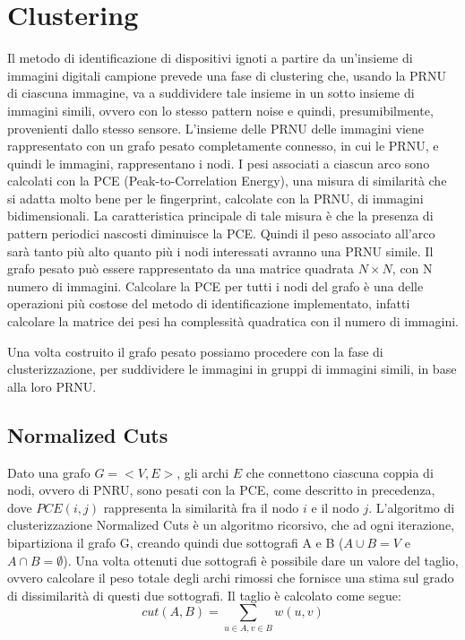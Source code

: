 \section{Clustering}

Il metodo di identificazione di dispositivi ignoti a partire da un'insieme di immagini digitali campione prevede una fase di clustering che, usando la PRNU di ciascuna immagine, va a suddividere tale insieme in un sotto insieme di immagini simili, ovvero con lo stesso pattern noise e quindi, presumibilmente, provenienti dallo stesso sensore.
L'insieme delle PRNU delle immagini viene rappresentato con un grafo pesato completamente connesso, in cui le PRNU, e quindi le immagini, rappresentano i nodi. I pesi associati a ciascun arco sono calcolati con la PCE (Peak-to-Correlation Energy), una misura di similarità che si adatta molto bene per le fingerprint, calcolate con la PRNU, di immagini bidimensionali. La caratteristica principale di tale misura è che la presenza di pattern periodici nascosti diminuisce la PCE. Quindi il peso associato all'arco sarà tanto più alto quanto più i nodi interessati avranno una PRNU simile. Il grafo pesato può essere rappresentato da una matrice quadrata $N\times N$, con N numero di immagini.
Calcolare la PCE per tutti i nodi del grafo è una delle operazioni più costose del metodo di identificazione implementato, infatti calcolare la matrice dei pesi ha complessità quadratica con il numero di immagini.

Una volta costruito il grafo pesato possiamo procedere con la fase di clusterizzazione, per suddividere le immagini in gruppi di immagini simili, in base alla loro PRNU.


\subsection{Normalized Cuts}

Dato una grafo $ G = <V, E> $, gli archi $E$ che connettono ciascuna coppia di nodi, ovvero di PNRU, sono pesati con la PCE, come descritto in precedenza, dove $PCE(i, j)$ rappresenta la similarità fra il nodo $i$ e il nodo $j$.
L'algoritmo di clusterizzazione Normalized Cuts è un algoritmo ricorsivo, che ad ogni iterazione, bipartiziona il grafo G, creando quindi due sottografi A e B ($A\cup B = V$ e $A\cap B = \emptyset$). Una volta ottenuti due sottografi è possibile dare un valore del taglio, ovvero calcolare il peso totale  degli archi rimossi che fornisce una stima sul grado di dissimilarità di questi due sottografi. Il taglio è calcolato come segue: $$ cut(A,B) = \sum_{u\in A, v\in B} w(u, v) $$


